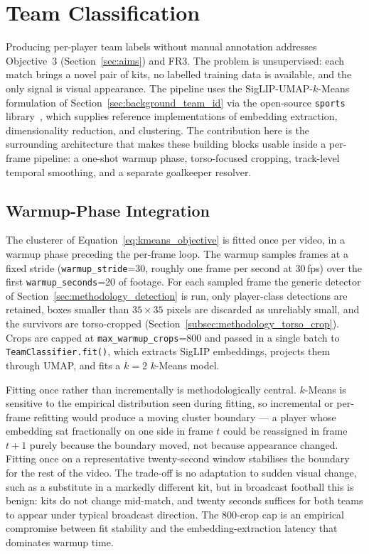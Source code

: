 \section{Team Classification}
\label{sec:methodology_team}

Producing per-player team labels without manual annotation addresses
Objective~3 (Section~\ref{sec:aims}) and FR3. The problem is unsupervised:
each match brings a novel pair of kits, no labelled training data is
available, and the only signal is visual appearance. The pipeline uses the
SigLIP-UMAP-$k$-Means formulation of Section~\ref{sec:background_team_id}
via the open-source \texttt{sports} library~\cite{roboflow_sports}, which
supplies reference implementations of embedding extraction, dimensionality
reduction, and clustering. The contribution here is the surrounding
architecture that makes these building blocks usable inside a per-frame
pipeline: a one-shot warmup phase, torso-focused cropping, track-level
temporal smoothing, and a separate goalkeeper resolver.

\subsection{Warmup-Phase Integration}
\label{subsec:methodology_warmup}

The clusterer of Equation~\ref{eq:kmeans_objective} is fitted once per
video, in a warmup phase preceding the per-frame loop. The warmup samples
frames at a fixed stride (\texttt{warmup\_stride}=30, roughly one frame per
second at 30\,fps) over the first \texttt{warmup\_seconds}=20 of footage.
For each sampled frame the generic detector of Section~\ref{sec:methodology_detection} is run, only player-class
detections are retained, boxes smaller than $35 \times 35$ pixels are
discarded as unreliably small, and the survivors are torso-cropped
(Section~\ref{subsec:methodology_torso_crop}). Crops are capped at
\texttt{max\_warmup\_crops}=800 and passed in a single batch to
\texttt{TeamClassifier.fit()}, which extracts SigLIP embeddings, projects
them through UMAP, and fits a $k=2$ $k$-Means model.

Fitting once rather than incrementally is methodologically central. $k$-Means
is sensitive to the empirical distribution seen during fitting, so
incremental or per-frame refitting would produce a moving cluster boundary
--- a player whose embedding sat fractionally on one side in frame $t$
could be reassigned in frame $t+1$ purely because the boundary moved, not
because appearance changed. Fitting once on a representative twenty-second
window stabilises the boundary for the rest of the video. The trade-off is
no adaptation to sudden visual change, such as a substitute in a markedly
different kit, but in broadcast football this is benign: kits do not change
mid-match, and twenty seconds suffices for both teams to appear under
typical broadcast direction. The 800-crop cap is an empirical compromise
between fit stability and the embedding-extraction latency that dominates
warmup time.

